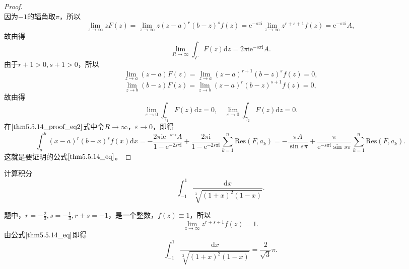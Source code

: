 \documentclass[../../main.tex]{subfiles}
\begin{document}
\begin{proof}
\[\]
因为\(-1\)的辐角取\(\pi\)，所以
\[
\lim_{z \to \infty} z F(z) = \lim_{z \to \infty} z (z - a)^r (b - z)^s f(z)
= \mathrm{e}^{-s\pi \mathrm{i}} \lim_{z \to \infty} z^{r + s + 1} f(z)
= \mathrm{e}^{-s\pi \mathrm{i}} A,
\]
故由得
\[
\lim_{R \to \infty} \int_{\Gamma} F(z) \mathrm{d}z = 2\pi \mathrm{i} \mathrm{e}^{-s\pi \mathrm{i}} A.
\]
由于\( r + 1 > 0, s + 1 > 0 \)，所以
\[
\lim_{z \to a} (z - a) F(z) = \lim_{z \to a} (z - a)^{r + 1} (b - z)^s f(z)
= 0,
\]
\[
\lim_{z \to b} (b - z) F(z) = \lim_{z \to b} (z - a)^r (b - z)^{s + 1} f(z)
= 0,
\]
故由得
\[
\lim_{\varepsilon \to 0} \int_{\gamma_1} F(z) \mathrm{d}z = 0,
\quad
\lim_{\varepsilon \to 0} \int_{\gamma_2} F(z) \mathrm{d}z = 0.
\]
在\(\eqref{thm5.5.14_proof_eq2}\)式中令\( R \to \infty \)，\( \varepsilon \to 0 \)，即得
\[
\int_{a}^{b} (x - a)^r (b - x)^s f(x) \mathrm{d}x
= -\frac{2\pi \mathrm{i} \mathrm{e}^{-s\pi \mathrm{i}} A}{1 - \mathrm{e}^{-2s\pi \mathrm{i}}} + \frac{2\pi \mathrm{i}}{1 - \mathrm{e}^{-2s\pi \mathrm{i}}} \sum_{k = 1}^{n} \mathrm{Res}(F, a_k)
= -\frac{\pi A}{\sin s\pi} + \frac{\pi}{\mathrm{e}^{-s\pi \mathrm{i}} \sin s\pi} \sum_{k = 1}^{n} \mathrm{Res}(F, a_k).
\]
这就是要证明的公式\(\eqref{thm5.5.14_eq}\)。

\end{proof}

\begin{example}
计算积分
\[
\int_{-1}^{1} \frac{\mathrm{d}x}{\sqrt[3]{(1 + x)^2 (1 - x)}}.
\]
\end{example}
\begin{solution}
题中，\( r = -\frac{2}{3}, s = -\frac{1}{3}, r + s = -1 \)，是一个整数，\( f(z) \equiv 1 \)，所以
\[
\lim_{z \to \infty} z^{r + s + 1} f(z) = 1.
\]
由公式\(\eqref{thm5.5.14_eq}\)即得
\[
\int_{-1}^{1} \frac{\mathrm{d}x}{\sqrt[3]{(1 + x)^2 (1 - x)}} = \frac{2}{\sqrt{3}} \pi.
\]

\end{solution}
\end{document}
